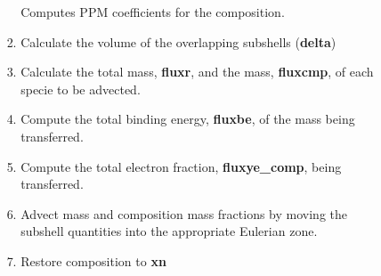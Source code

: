 \documentclass[11pt,doublespace]{article}
\begin{document}
\begin{itemize}
\begin{enumerate}
\begin{enumerate}
\begin{enumerate}
  Computes PPM coefficients for the composition.
  \item Calculate the volume of the overlapping subshells ({\bf delta})
  \item Calculate the total mass, {\bf fluxr}, and the mass, {\bf fluxcmp}, of each specie to be advected.
  \item Compute the total binding energy, {\bf fluxbe}, of the mass being transferred.
  \item Compute the total electron fraction, {\bf fluxye\_comp}, being transferred.
  \item Advect mass and composition mass fractions by moving the subshell quantities into the appropriate Eulerian zone.
  \item Restore composition to {\bf xn}
\end{enumerate}
\end{enumerate}
\end{enumerate}

\end{itemize}
\end{document}
